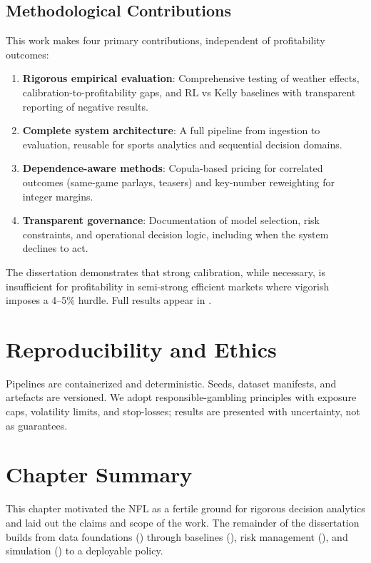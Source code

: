 \subsection{Methodological Contributions}

This work makes four primary contributions, independent of profitability outcomes:
\begin{enumerate}
  \item \textbf{Rigorous empirical evaluation}: Comprehensive testing of weather effects, calibration-to-profitability gaps, and RL vs Kelly baselines with transparent reporting of negative results.
  \item \textbf{Complete system architecture}: A full pipeline from ingestion to evaluation, reusable for sports analytics and sequential decision domains.
  \item \textbf{Dependence-aware methods}: Copula-based pricing for correlated outcomes (same-game parlays, teasers) and key-number reweighting for integer margins.
  \item \textbf{Transparent governance}: Documentation of model selection, risk constraints, and operational decision logic, including when the system declines to act.
\end{enumerate}

\noindent The dissertation demonstrates that strong calibration, while necessary, is insufficient for profitability in semi-strong efficient markets where vigorish imposes a 4--5\% hurdle. Full results appear in .

\section{Reproducibility and Ethics}
Pipelines are containerized and deterministic. Seeds, dataset manifests, and artefacts are versioned. We adopt responsible-gambling principles with exposure caps, volatility limits, and stop-losses; results are presented with uncertainty, not as guarantees.

\section{Chapter Summary}
This chapter motivated the NFL as a fertile ground for rigorous decision analytics and laid out the claims and scope of the work. The remainder of the dissertation builds from data foundations () through baselines (), risk management (), and simulation () to a deployable policy.

